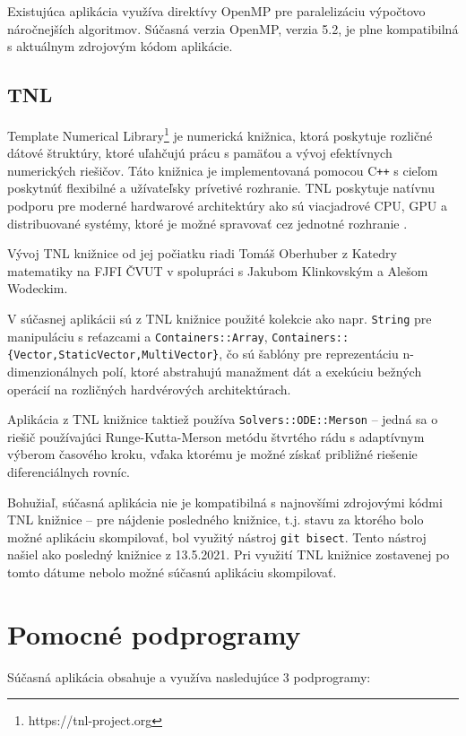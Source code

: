 Existujúca aplikácia využíva direktívy OpenMP pre paralelizáciu výpočtovo náročnejších algoritmov. Súčasná verzia OpenMP, verzia 5.2, je plne kompatibilná s aktuálnym zdrojovým kódom aplikácie.

\subsection {TNL}\label{tnl}
Template Numerical Library\footnote{https://tnl-project.org} je numerická knižnica, ktorá poskytuje rozličné dátové štruktúry, ktoré uľahčujú prácu s pamäťou a vývoj efektívnych numerických riešičov. Táto knižnica je implementovaná pomocou C\texttt{++} s cieľom poskytnúť flexibilné a užívateľsky prívetivé rozhranie. TNL poskytuje natívnu podporu pre moderné hardwarové architektúry ako sú viacjadrové CPU, GPU a distribuované systémy, ktoré je možné spravovať cez jednotné rozhranie \cite{tnl_description}.

Vývoj TNL knižnice od jej počiatku riadi Tomáš Oberhuber z Katedry matematiky na FJFI ČVUT v spolupráci s Jakubom Klinkovským a Alešom Wodeckim.

V súčasnej aplikácii sú z TNL knižnice použité kolekcie ako napr. \texttt{String} pre manipuláciu s reťazcami a \texttt{Containers::Array}, \texttt{Containers::\{Vector,\newline StaticVector,MultiVector\}}, čo sú šablóny pre reprezentáciu \newline n-dimenzionálnych polí, ktoré abstrahujú manažment dát a exekúciu bežných operácií na rozličných hardvérových architektúrach.

Aplikácia z TNL knižnice taktiež používa \texttt{Solvers::ODE::Merson} -- jedná sa o riešič používajúci Runge-Kutta-Merson metódu štvrtého rádu s adaptívnym výberom časového kroku, vďaka ktorému je možné získať približné riešenie diferenciálnych rovníc.

\clearpage

Bohužiaľ, súčasná aplikácia nie je kompatibilná s najnovšími zdrojovými kódmi TNL knižnice -- pre nájdenie posledného  knižnice, t.j. stavu za ktorého bolo možné aplikáciu skompilovať, bol využitý nástroj \texttt{git bisect}. Tento nástroj našiel ako posledný  knižnice z 13.5.2021. Pri využití TNL knižnice zostavenej po tomto dátume nebolo možné súčasnú aplikáciu skompilovať.

\section {Pomocné podprogramy}\label{helper_apps}
Súčasná aplikácia obsahuje a využíva nasledujúce 3 podprogramy:


